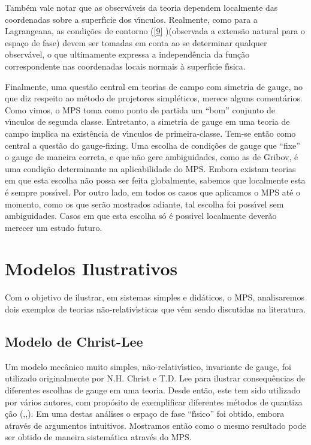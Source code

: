 \documentclass[a4paper,thmsa,12pt]{report}
\begin{document}
Tamb\'{e}m vale notar que as observ\'{a}veis da teoria dependem localmente
das coordenadas \myHighlight{$\xi ^{\ast }$}\coordHE{} sobre a superf\'{\i}cie dos v\'{\i}nculos.
Realmente, como para a Lagrangeana, as condi\c{c}\~{o}es de contorno (\ref{9}%
)(observada a extens\~{a}o natural para o espa\c{c}o de fase) devem ser
tomadas em conta ao se determinar qualquer observ\'{a}vel, o que ultimamente
expressa a independ\^{e}ncia da fun\c{c}\~{a}o correspondente nas
coordenadas locais normais \`{a} superf\'{\i}cie f\'{\i}sica.

Finalmente, uma quest\~{a}o central em teorias de campo com simetria de
gauge, no que diz respeito ao m\'{e}todo de projetores simpl\'{e}ticos,
merece alguns coment\'{a}rios. Como vimos, o MPS toma como ponto de partida
um ``bom'' conjunto de v\'{\i}nculos de segunda classe. Entretanto, a
simetria de gauge em uma teoria de campo implica na exist\^{e}ncia de
v\'{\i}nculos de primeira-classe. Tem-se ent\~{a}o como central a
quest\~{a}o do gauge-fixing. Uma escolha de condi\c{c}\~{o}es de gauge que
``fixe'' o gauge de maneira correta, e que n\~{a}o gere ambiguidades, como
as de Gribov, \'{e} uma condi\c{c}\~{a}o determinante na aplicabilidade do
MPS. Embora existam teorias em que esta escolha n\~{a}o possa ser feita
globalmente, sabemos que localmente esta \'{e} sempre poss\'{\i}vel. Por
outro lado, em todos os casos que aplicamos o MPS at\'{e} o momento, como os
que ser\~{a}o mostrados adiante, tal escolha foi poss\'{\i}vel sem
ambiguidades. Casos em que esta escolha s\'{o} \'{e} possivel localmente
dever\~{a}o merecer um estudo futuro.

\chapter{{\sc Modelos Ilustrativos}}

Com o objetivo de ilustrar, em sistemas simples e did\'{a}ticos, o MPS,
analisaremos dois exemplos de teorias n\~{a}o-relativ\'{\i}sticas que
v\^{e}m sendo discutidas na literatura.

\section{{\sc Modelo de Christ-Lee}}

Um modelo mec\^{a}nico muito simples, n\~{a}o-relativ\'{\i}stico, invariante
de gauge, foi utilizado originalmente por N.H. Christ e T.D. Lee\cite
{christ-lee} para ilustrar consequ\^{e}ncias de diferentes escolhas de gauge
em uma teoria. Desde ent\~{a}o, este tem sido utilizado por v\'{a}rios
autores, com prop\'{o}sito de exemplificar diferentes m\'{e}todos de quantiza%
\c{c}\~{a}o (\cite{costa-girotti},\cite{phokhorov},\cite{bouzas}). Em uma
destas an\'{a}lises \cite{costa-girotti} o espa\c{c}o de fase
``f\'{\i}sico'' foi obtido, embora atrav\'{e}s de argumentos intuitivos.
Mostramos ent\~{a}o \cite{c-lee} como o mesmo resultado pode ser obtido de
maneira sistem\'{a}tica atrav\'{e}s do MPS.
\end{document}
